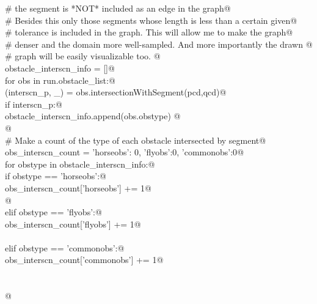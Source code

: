 \documentclass[11.5pt]{report}
\begin{document}
\begin{flushleft}
\begin{minipage}{\linewidth}
\begin{list}{}{}
\mbox{}\verb@             #    the segment is *NOT* included as an edge in the graph@\\
\mbox{}\verb@             # Besides this only those segments whose length is less than a certain given@\\
\mbox{}\verb@             # tolerance is included in the graph. This will allow me to make the graph@\\
\mbox{}\verb@             # denser and the domain more well-sampled. And more importantly the drawn @\\
\mbox{}\verb@             # graph will be easily visualizable too. @\\
\mbox{}\verb@             obstacle_interscn_info = []@\\
\mbox{}\verb@             for obs in run.obstacle_list:@\\
\mbox{}\verb@                   (interscn_p, _) = obs.intersectionWithSegment(pcd,qcd)@\\
\mbox{}\verb@                   if interscn_p:@\\
\mbox{}\verb@                       obstacle_interscn_info.append(obs.obstype)    @\\
\mbox{}\verb@ @\\
\mbox{}\verb@             # Make a count of the type of each obstacle intersected by segment@\\
\mbox{}\verb@             obs_interscn_count = {'horseobs': 0, 'flyobs':0, 'commonobs':0}@\\
\mbox{}\verb@             for obstype in obstacle_interscn_info:@\\
\mbox{}\verb@                if   obstype == 'horseobs':@\\
\mbox{}\verb@                         obs_interscn_count['horseobs']  += 1@\\
\mbox{}\verb@                 @\\
\mbox{}\verb@                elif obstype == 'flyobs':@\\
\mbox{}\verb@                         obs_interscn_count['flyobs']    += 1@\\
\mbox{}\verb@@\\
\mbox{}\verb@                elif obstype == 'commonobs':@\\
\mbox{}\verb@                         obs_interscn_count['commonobs'] += 1@\\
\mbox{}\verb@@\\
\mbox{}\verb@@\\
\mbox{}\verb@    @\\

\end{list}
\end{minipage}
\end{flushleft}
\end{document}
